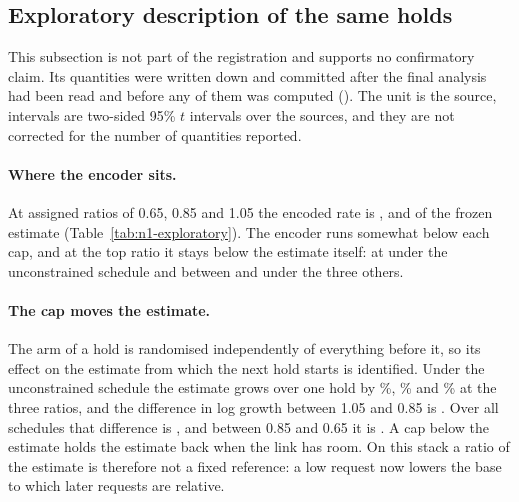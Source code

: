 \subsection{Exploratory description of the same holds}
\label{sec:native-n1-exploratory}
This subsection is not part of the registration and supports no confirmatory claim. Its quantities were written down and committed after the final analysis had been read and before any of them was computed (). The unit is the source, intervals are two-sided 95\% $t$ intervals over the \NOneSources{} sources, and they are not corrected for the number of quantities reported.

\begin{table}[t]
\centering\small
\resizebox{\linewidth}{!}{}
\caption{Exploratory. Per capacity schedule: the encoded rate as a share of the frozen estimate at each assigned ratio; the difference between ratios 1.05 and 0.85 in the log growth of the estimate from one hold to the next; and the difference between ratios 1.05 and 0.65 in the on-time sampled PSNR contribution and in the on-time fraction of the frames captured in the outcome window. Brackets are 95\% intervals over sources.}
\label{tab:n1-exploratory}
\end{table}

\paragraph{Where the encoder sits.}
At assigned ratios of 0.65, 0.85 and 1.05 the encoded rate is \NOneExpLevelLow{}, \NOneExpLevelMid{} and \NOneExpLevelHigh{} of the frozen estimate (Table~\ref{tab:n1-exploratory}). The encoder runs somewhat below each cap, and at the top ratio it stays below the estimate itself: at \NOneExpFreeLevelHigh{} under the unconstrained schedule and between \NOneExpHeldLevelMin{} and \NOneExpHeldLevelMax{} under the three others.

\paragraph{The cap moves the estimate.}
The arm of a hold is randomised independently of everything before it, so its effect on the estimate from which the next hold starts is identified. Under the unconstrained schedule the estimate grows over one hold by \NOneExpFreeGrowthLow\%, \NOneExpFreeGrowthMid\% and \NOneExpFreeGrowthHigh\% at the three ratios, and the difference in log growth between 1.05 and 0.85 is \NOneExpFreeGrowthTop{} \NOneExpFreeGrowthTopT{}. Over all schedules that difference is \NOneExpGrowthTop{} \NOneExpGrowthTopT{}, and between 0.85 and 0.65 it is \NOneExpGrowthLow{} \NOneExpGrowthLowT{}. A cap below the estimate holds the estimate back when the link has room. On this stack a ratio of the estimate is therefore not a fixed reference: a low request now lowers the base to which later requests are relative.

